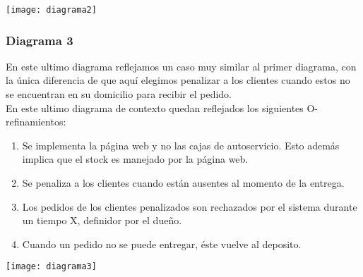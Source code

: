 \texttt{[image: diagrama2]}

\subsubsection{Diagrama 3}
En este ultimo diagrama reflejamos un caso muy similar al primer diagrama, con la única diferencia de que aquí elegimos penalizar a los clientes cuando estos no se encuentran en su domicilio para recibir el pedido.\\
En este ultimo diagrama de contexto quedan reflejados los siguientes O-refinamientos:
\begin{enumerate}
\item Se implementa la página web y no las cajas de autoservicio. Esto además implica que el stock es manejado por la página web.
\item Se penaliza a los clientes cuando están ausentes al momento de la entrega.
\item Los pedidos de los clientes penalizados son rechazados por el sistema durante un tiempo X, definidor por el dueño.
\item Cuando un pedido no se puede entregar, éste vuelve al deposito.
\end{enumerate}

\texttt{[image: diagrama3]}